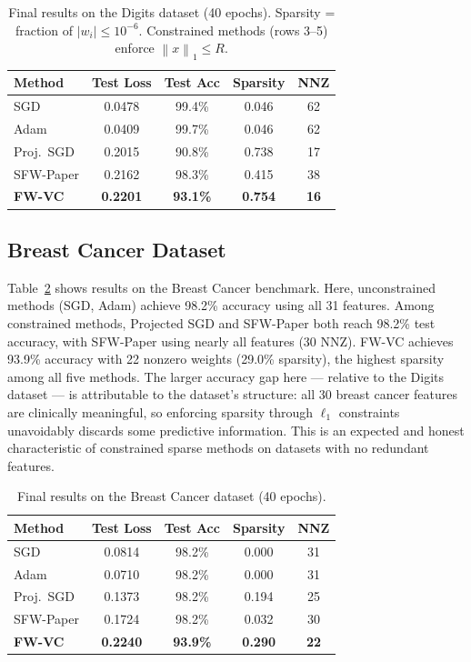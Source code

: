 \documentclass[10pt,twocolumn]{article}
\newcommand{\norm}[1]{\left\|#1\right\|}
\begin{document}
\begin{table}[h]
\centering
\caption{Final results on the Digits dataset (40 epochs).
Sparsity = fraction of $|w_i| \leq 10^{-6}$.
Constrained methods (rows 3--5) enforce $\norm{x}_1 \leq R$.}
\label{tab:digits}
\footnotesize
\begin{tabular}{lcccc}
\toprule
Method & Test Loss & Test Acc & Sparsity & NNZ \\
\midrule
SGD           & 0.0478 & 99.4\% & 0.046 & 62 \\
Adam          & 0.0409 & 99.7\% & 0.046 & 62 \\
\midrule
Proj.\ SGD    & 0.2015 & 90.8\% & 0.738 & 17 \\
SFW-Paper     & 0.2162 & 98.3\% & 0.415 & 38 \\
\textbf{FW-VC}& \textbf{0.2201} & \textbf{93.1\%} & \textbf{0.754} & \textbf{16} \\
\bottomrule
\end{tabular}
\end{table}

\subsection{Breast Cancer Dataset}

Table~\ref{tab:bc} shows results on the Breast Cancer benchmark.
Here, unconstrained methods (SGD, Adam) achieve 98.2\% accuracy using
all 31 features. Among constrained methods, Projected SGD and SFW-Paper
both reach 98.2\% test accuracy, with SFW-Paper using nearly all
features (30 NNZ). FW-VC achieves 93.9\% accuracy with 22 nonzero
weights (29.0\% sparsity), the highest sparsity among all five methods.
The larger accuracy gap here — relative to the Digits dataset — is
attributable to the dataset's structure: all 30 breast cancer features
are clinically meaningful, so enforcing sparsity through $\ell_1$
constraints unavoidably discards some predictive information.
This is an expected and honest characteristic of constrained sparse
methods on datasets with no redundant features.

\begin{table}[h]
\centering
\caption{Final results on the Breast Cancer dataset (40 epochs).}
\label{tab:bc}
\footnotesize
\begin{tabular}{lcccc}
\toprule
Method & Test Loss & Test Acc & Sparsity & NNZ \\
\midrule
SGD           & 0.0814 & 98.2\% & 0.000 & 31 \\
Adam          & 0.0710 & 98.2\% & 0.000 & 31 \\
\midrule
Proj.\ SGD    & 0.1373 & 98.2\% & 0.194 & 25 \\
SFW-Paper     & 0.1724 & 98.2\% & 0.032 & 30 \\
\textbf{FW-VC}& \textbf{0.2240} & \textbf{93.9\%} & \textbf{0.290} & \textbf{22} \\
\bottomrule
\end{tabular}
\end{table}
\end{document}
